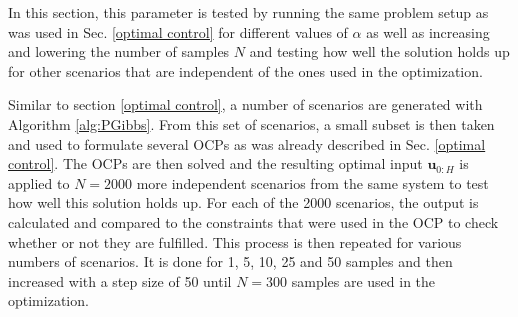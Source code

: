 In this section, this parameter is tested by running the same problem setup as was used in Sec. \ref{optimal control} for different values of $\alpha$ as well as increasing and lowering the number of samples $N$ and testing how well the solution holds up for other scenarios that are independent of the ones used in the optimization.

Similar to section \ref{optimal control}, a number of scenarios are generated with Algorithm \ref{alg:PGibbs}. From this set of scenarios, a small subset is then taken and used to formulate several OCPs as was already described in Sec. \ref{optimal control}. The OCPs are then solved and the resulting optimal input $\boldsymbol{u}_{0:H}$ is applied to $N = 2000$ more independent scenarios from the same system to test how well this solution holds up. For each of the 2000 scenarios, the output is calculated and compared to the constraints that were used in the OCP to check whether or not they are fulfilled. This process is then repeated for various numbers of scenarios. It is done for 1, 5, 10, 25 and 50 samples and then increased with a step size of 50 until $N = 300$ samples are used in the optimization.

